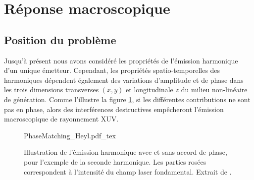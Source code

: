 \section{Réponse macroscopique}
\label{sec:AccordDePhase}
\subsection{Position du problème}
Jusqu'à présent nous avons considéré les propriétés de l'émission harmonique d'un unique émetteur. Cependant, les propriétés spatio-temporelles des harmoniques dépendent également des variations d'amplitude et de phase dans les trois dimensions transverses $(x,y)$ et longitudinale $z$ du milieu non-linéaire de génération. Comme l'illustre la figure \ref{fig:PhaseMatchingHeyl}, si les différentes contributions ne sont pas en phase, alors des interférences destructives empêcheront l'émission macroscopique de rayonnement XUV.

\begin{figure}[ht]
\centering
\def\svgwidth{0.7\columnwidth}
{PhaseMatching_Heyl.pdf_tex}
\caption{Illustration de l'émission harmonique avec et sans accord de phase, pour l'exemple de la seconde harmonique. Les parties rosées correspondent à l'intensité du champ laser fondamental. Extrait de .}
\label{fig:PhaseMatchingHeyl}
\end{figure}

